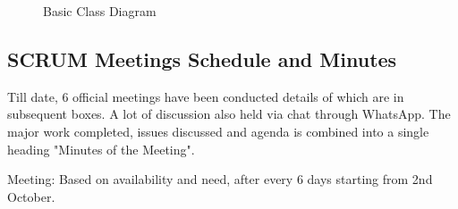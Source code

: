 \begin{figure}[H]
    \centering
    \caption{Basic Class Diagram}
    \label{fig:class_diagram}
\end{figure}
\vspace{1cm}

\subsection{SCRUM Meetings Schedule and Minutes}
Till date, 6 official meetings have been conducted details of which are in subsequent boxes. A lot of discussion also held via chat through WhatsApp. The major work completed, issues discussed and agenda is combined into a single heading "Minutes of the Meeting".

Meeting: Based on availability and need, after every 6 days starting from 2nd October.


